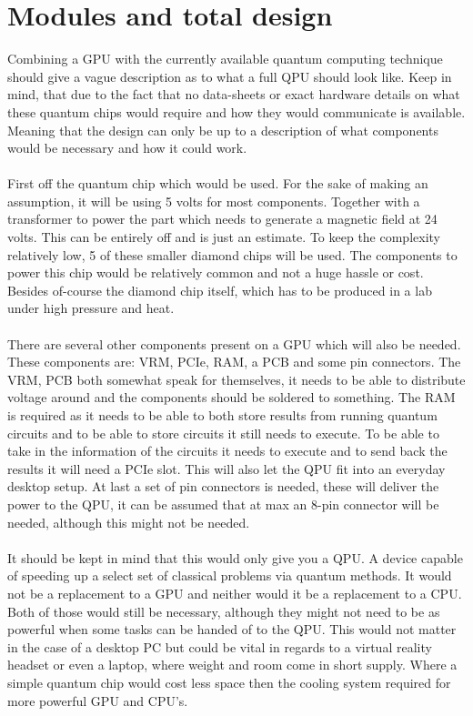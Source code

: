 \section{Modules and total design}
\label{sec:experiments}
Combining a GPU with the currently available quantum computing technique should give a vague description as to what a full QPU should look like. Keep in mind, that due to the fact that no data-sheets or exact hardware details on what these quantum chips would require and how they would communicate is available. Meaning that the design can only be up to a description of what components would be necessary and how it could work.
\\\\
First off the quantum chip which would be used. For the sake of making an assumption, it will be using 5 volts for most components. Together with a transformer to power the part which needs to generate a magnetic field at 24 volts.  This can be entirely off and is just an estimate. To keep the complexity relatively low, 5 of these smaller diamond chips will be used. The components to power this chip would be relatively common and not a huge hassle or cost. Besides of-course the diamond chip itself, which has to be produced in a lab under high pressure and heat. 
\\\\
There are several other components present on a GPU which will also be needed. These components are: VRM, PCIe, RAM, a PCB and some pin connectors. The VRM, PCB both somewhat speak for themselves, it needs to be able to distribute voltage around and the components should be soldered to something. The RAM is required as it needs to be able to both store results from running quantum circuits and to be able to store circuits it still needs to execute. To be able to take in the information of the circuits it needs to execute and to send back the results it will need a PCIe slot. This will also let the QPU fit into an everyday desktop setup. At last a set of pin connectors is needed, these will deliver the power to the QPU, it can be assumed that at max an 8-pin connector will be needed, although this might not be needed.
\\\\
It should be kept in mind that this would only give you a QPU. A device capable of speeding up a select set of classical problems via quantum methods. It would not be a replacement to a GPU and neither would it be a replacement to a CPU. Both of those would still be necessary, although they might not need to be as powerful when some tasks can be handed of to the QPU. This would not matter in the case of a desktop PC but could be vital in regards to a virtual reality headset or even a laptop, where weight and room come in short supply. Where a simple quantum chip would cost less space then the cooling system required for more powerful GPU and CPU's. 
